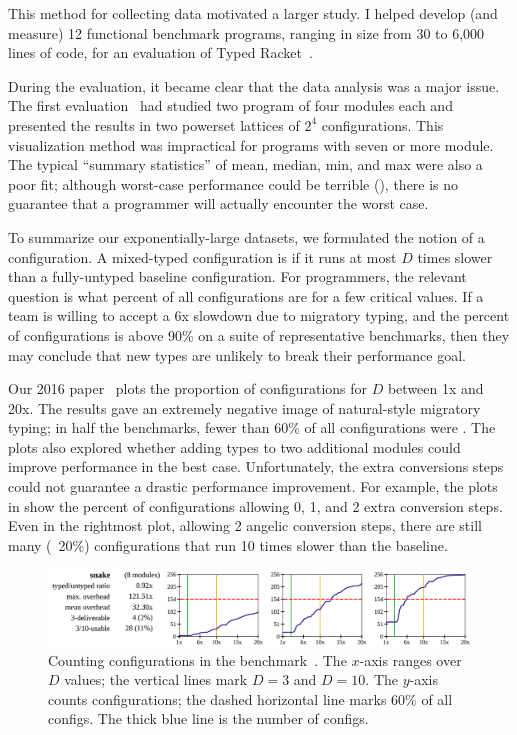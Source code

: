 This method for collecting data motivated a larger study.
I helped develop (and measure) 12 functional benchmark programs, ranging in
 size from 30 to 6,000 lines of code, for an evaluation of Typed
 Racket~\cite{tfgnvf-popl-2016}.

During the evaluation, it became clear that the data analysis was a major
 issue.
The first evaluation~\cite{tfdfftf-ecoop-2015} had studied two program of four modules each
 and presented the results in two powerset lattices of $2^4$ configurations.
This visualization method was impractical for programs with seven or more
 module.
The typical ``summary statistics'' of mean, median, min, and max were also a
 poor fit; although worst-case performance could be terrible
 (), there is no guarantee that a programmer
 will actually encounter the worst case.

To summarize our exponentially-large datasets, we formulated the notion
 of a  configuration.
A mixed-typed configuration is  if it runs at most $D$ times
 slower than a fully-untyped baseline configuration.
For programmers, the relevant question is what percent of all configurations
 are  for a few critical values.
If a team is willing to accept a 6x slowdown due to migratory typing,
 and the percent of  configurations is above 90\% on a suite
 of representative benchmarks, then they may conclude that new types are
 unlikely to break their performance goal.

Our 2016 paper~\cite{tfgnvf-popl-2016} plots the proportion of
  configurations for $D$ between 1x and 20x.
The results gave an extremely negative image of natural-style migratory typing;
 in half the benchmarks, fewer than 60\% of all configurations were
 .
The plots also explored whether adding types to two additional modules could
 improve performance in the best case.
Unfortunately, the extra conversions steps could not guarantee a drastic
 performance improvement.
For example, the plots in  show the percent of
  configurations allowing 0, 1, and 2 extra conversion steps.
Even in the rightmost plot, allowing 2 angelic conversion steps, there are
 still many (~20\%) configurations that run 10 times slower than the baseline.

\begin{figure}[h]
\includegraphics[width=0.96\columnwidth]{src/snake-popl.png}
\caption{Counting  configurations in the 
         benchmark~\cite{tfgnvf-popl-2016}. The $x$-axis ranges over $D$ values;
         the vertical lines mark $D=3$ and $D=10$.
         The $y$-axis counts configurations; the dashed horizontal line marks
         $60$\% of all configs.
         The thick blue line is the number of  configs.}
\label{fig:snake-popl}
\end{figure}


